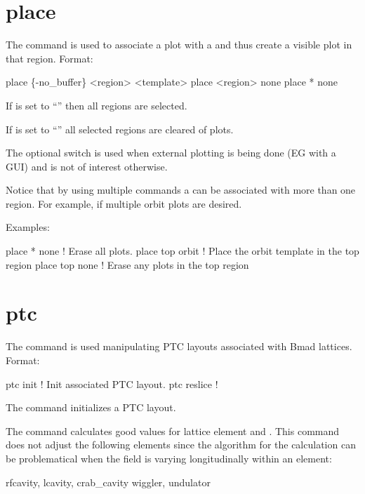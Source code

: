 \section{place}
\label{s:place}

The  command is used to associate a  plot with a  and thus
create a visible plot in that region. Format:
\begin{example}
  place \{-no_buffer\} <region> <template>
  place <region> none
  place * none
\end{example}

\vskip 10pt 
If  is set to ``\vn{*}'' then all regions are selected.

If  is set to ``'' all selected regions are cleared of plots.

The  optional switch is used when external plotting is being done (EG with a GUI) and
is not of interest otherwise.

Notice that by using multiple  commands a  can be associated with more than
one region. For example, if multiple orbit plots are desired.

Examples:
\begin{example}
  place * none     ! Erase all plots.
  place top orbit  ! Place the orbit template in the top region
  place top none   ! Erase any plots in the top region
\end{example}

\section{ptc}
\label{s:ptc}

The  command is used manipulating PTC layouts associated with Bmad
lattices. Format:
\begin{example}
  ptc init            ! Init associated PTC layout.
  ptc reslice         !
\end{example}

\vskip 10pt 

The  command initializes a PTC layout.

The  command calculates good values for lattice element  and . This
command does not adjust the following elements since the algorithm for the calculation can be problematical when the field
is varying longitudinally within an element:
\begin{example}
  rfcavity, lcavity, crab_cavity
  wiggler, undulator
\end{example}

